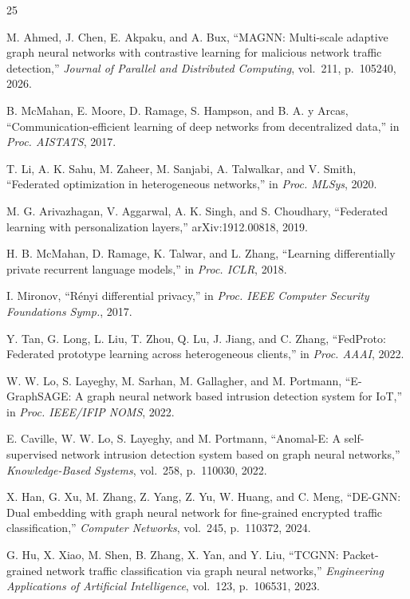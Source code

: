 \documentclass[journal]{IEEEtran}
\begin{document}
\begin{thebibliography}{25}

 M. Ahmed, J. Chen, E. Akpaku, and A. Bux, ``MAGNN:
Multi-scale adaptive graph neural networks with contrastive learning
for malicious network traffic detection,'' \emph{Journal of Parallel
and Distributed Computing}, vol.~211, p.~105240, 2026.

 B. McMahan, E. Moore, D. Ramage, S. Hampson, and
B. A. y Arcas, ``Communication-efficient learning of deep networks
from decentralized data,'' in \emph{Proc. AISTATS}, 2017.

 T. Li, A. K. Sahu, M. Zaheer, M. Sanjabi,
A. Talwalkar, and V. Smith, ``Federated optimization in heterogeneous
networks,'' in \emph{Proc. MLSys}, 2020.

 M. G. Arivazhagan, V. Aggarwal, A. K. Singh, and
S. Choudhary, ``Federated learning with personalization layers,''
arXiv:1912.00818, 2019.

 H. B. McMahan, D. Ramage, K. Talwar, and L. Zhang,
``Learning differentially private recurrent language models,'' in
\emph{Proc. ICLR}, 2018.

 I. Mironov, ``R\'enyi differential privacy,'' in
\emph{Proc. IEEE Computer Security Foundations Symp.}, 2017.

 Y. Tan, G. Long, L. Liu, T. Zhou, Q. Lu, J. Jiang,
and C. Zhang, ``FedProto: Federated prototype learning across
heterogeneous clients,'' in \emph{Proc. AAAI}, 2022.

 W. W. Lo, S. Layeghy, M. Sarhan, M. Gallagher,
and M. Portmann, ``E-GraphSAGE: A graph neural network based intrusion
detection system for IoT,'' in \emph{Proc. IEEE/IFIP NOMS}, 2022.

 E. Caville, W. W. Lo, S. Layeghy, and M. Portmann,
``Anomal-E: A self-supervised network intrusion detection system based
on graph neural networks,'' \emph{Knowledge-Based Systems}, vol.~258,
p.~110030, 2022.

 X. Han, G. Xu, M. Zhang, Z. Yang, Z. Yu, W. Huang, and
C. Meng, ``DE-GNN: Dual embedding with graph neural network for
fine-grained encrypted traffic classification,'' \emph{Computer
Networks}, vol.~245, p.~110372, 2024.

 G. Hu, X. Xiao, M. Shen, B. Zhang, X. Yan, and Y. Liu,
``TCGNN: Packet-grained network traffic classification via graph
neural networks,'' \emph{Engineering Applications of Artificial
Intelligence}, vol.~123, p.~106531, 2023.


\end{thebibliography}
\end{document}
